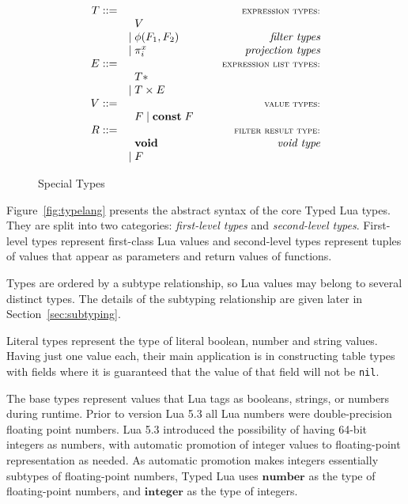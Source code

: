 \documentclass[preprint]{sigplanconf}
\newcommand{\Value}{\mathbf{value}}
\newcommand{\Integer}{\mathbf{integer}}
\newcommand{\Number}{\mathbf{number}}
\newcommand{\Const}{\mathbf{const}}
\begin{document}
\begin{figure*}[t]
$$
\begin{array}{rlr}
T ::= & & \textsc{{\small expression types:}}\\
& \;\; V & \\
& | \; \phi(F_{1},F_{2}) & \textit{filter types}\\
& | \; \pi_{i}^{x} & \textit{projection types}\\
E ::= & & \textsc{{\small expression list types:}}\\
& \;\; T{*} & \\
& | \; T \times E & \\
V ::= & & \textsc{{\small value types:}}\\
& \;\; F \; | \; \Const \; F &\\
R ::= & & \textsc{\small{filter result type:}}\\
& \;\; \mathbf{void} & \textit{void type}\\
& |\; F
\end{array}
$$
\caption{Special Types}
\label{fig:special}
\end{figure*}

Figure~\ref{fig:typelang} presents the abstract syntax of
the core Typed Lua types. They are split into two categories:
\emph{first-level types} and \emph{second-level types}.
First-level types represent first-class Lua values and
second-level types represent tuples of values that appear
as parameters and return values of functions.

Types are ordered by a subtype relationship, so Lua values may belong to several distinct types. The details of the subtyping
relationship are given later in Section~\ref{sec:subtyping}.

Literal types represent the type of literal boolean, number
and string values. Having just one value each, their main application is in constructing table types with fields where it is guaranteed that the value of that field will not be {\tt nil}.

The base types represent values that Lua tags as booleans,
strings, or numbers during runtime. Prior to version Lua 5.3 all Lua numbers were double-precision floating point numbers.
Lua 5.3 introduced the possibility of having 64-bit integers
as numbers, with automatic promotion of integer values to
floating-point representation as needed. As automatic
promotion makes integers essentially subtypes of floating-point numbers, Typed Lua uses $\Number$ as the type of floating-point numbers, and $\Integer$ as the type of integers.
\end{document}
